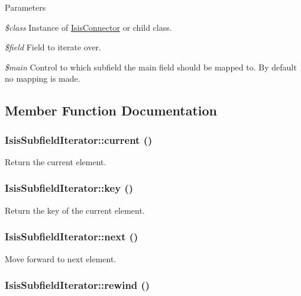 \begin{DoxyParams}{Parameters}
\item[{\em \$class}]Instance of \hyperlink{classIsisConnector}{IsisConnector} or child class.\item[{\em \$field}]Field to iterate over.\item[{\em \$main}]Control to which subfield the main field should be mapped to. By default no mapping is made. \end{DoxyParams}


\subsection{Member Function Documentation}
\hypertarget{classIsisSubfieldIterator_a7c31b7e8db31e1465d29fb58b2448bd8}{
\subsubsection[{current}]{\setlength{\rightskip}{0pt plus 5cm}IsisSubfieldIterator::current ()}}
\label{classIsisSubfieldIterator_a7c31b7e8db31e1465d29fb58b2448bd8}
Return the current element. \hypertarget{classIsisSubfieldIterator_a4ee62ad436a7c4ec1dac0c0c5d2a2c85}{
\subsubsection[{key}]{\setlength{\rightskip}{0pt plus 5cm}IsisSubfieldIterator::key ()}}
\label{classIsisSubfieldIterator_a4ee62ad436a7c4ec1dac0c0c5d2a2c85}
Return the key of the current element. \hypertarget{classIsisSubfieldIterator_a74363e3dbfbde6d409b8ba3b70fc9371}{
\subsubsection[{next}]{\setlength{\rightskip}{0pt plus 5cm}IsisSubfieldIterator::next ()}}
\label{classIsisSubfieldIterator_a74363e3dbfbde6d409b8ba3b70fc9371}
Move forward to next element. \hypertarget{classIsisSubfieldIterator_a971b36317fab4fc07573f215a118fb40}{
\subsubsection[{rewind}]{\setlength{\rightskip}{0pt plus 5cm}IsisSubfieldIterator::rewind ()}}
